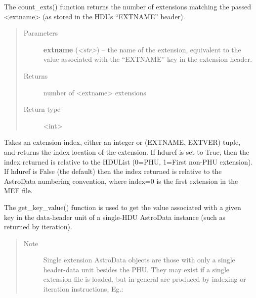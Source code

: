 \documentclass[letterpaper,10pt,english]{sphinxmanual}
\begin{document}
\begin{fulllineitems}
\begin{fulllineitems}
\label{astro_class:astrodata.AstroData.count_exts}
The count\_exts() function returns the number of extensions matching the
passed \textless{}extname\textgreater{} (as stored in the HDUs ``EXTNAME'' header).
\begin{quote}\begin{description}
\item[{Parameters}] \leavevmode
\textbf{extname} (\emph{\textless{}str\textgreater{}}) -- the name of the extension, equivalent to the
value associated with the ``EXTNAME'' key in the extension
header.

\item[{Returns}] \leavevmode
number of \textless{}extname\textgreater{} extensions

\item[{Return type}] \leavevmode
\textless{}int\textgreater{}

\end{description}\end{quote}

\end{fulllineitems}


\begin{fulllineitems}
\label{astro_class:astrodata.AstroData.ext_index}
Takes an extension index, either an integer or (EXTNAME, EXTVER) 
tuple, and returns the index location of the extension.  If hduref is 
set to True, then the index returned is relative to the HDUList 
(0=PHU, 1=First non-PHU extension). If hduref is False (the default) 
then the index returned is relative to the AstroData numbering 
convention, where index=0 is the first extension in the MEF file.

\end{fulllineitems}


\begin{fulllineitems}
\label{astro_class:astrodata.AstroData.get_key_value}
The get\_key\_value() function is used to get the value associated
with a given key in the data-header unit of a single-HDU
AstroData instance (such as returned by iteration).
\begin{quote}\begin{description}
\item[{Note}] \leavevmode
Single extension AstroData objects are those with only a single
header-data unit besides the PHU.  They may exist if a single
extension file is loaded, but in general are produced by indexing or
iteration instructions, Eg.:
\begin{quote}


\end{quote}
\end{description}
\end{quote}
\end{fulllineitems}
\end{fulllineitems}
\end{document}
